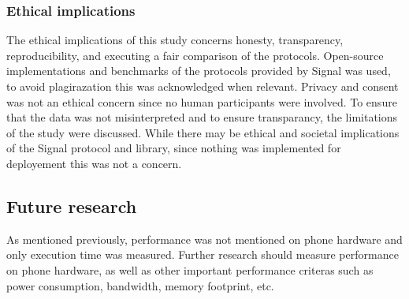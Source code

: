 \subsubsection{Ethical implications}
The ethical implications of this study concerns honesty, transparency, reproducibility, and executing a fair comparison of the protocols.
Open-source implementations and benchmarks of the protocols provided by Signal was used, to avoid plagirazation this was acknowledged when relevant.
Privacy and consent was not an ethical concern since no human participants were involved.
To ensure that the data was not misinterpreted and to ensure transparancy, the limitations of the study were discussed.
While there may be ethical and societal implications of the Signal protocol and library, since nothing was implemented for deployement this was not a concern.

\subsection{Future research}

As mentioned previously, performance was not mentioned on phone hardware and only execution time was measured.
Further research should measure performance on phone hardware,
as well as other important performance criteras such as power consumption, bandwidth, memory footprint, etc.
